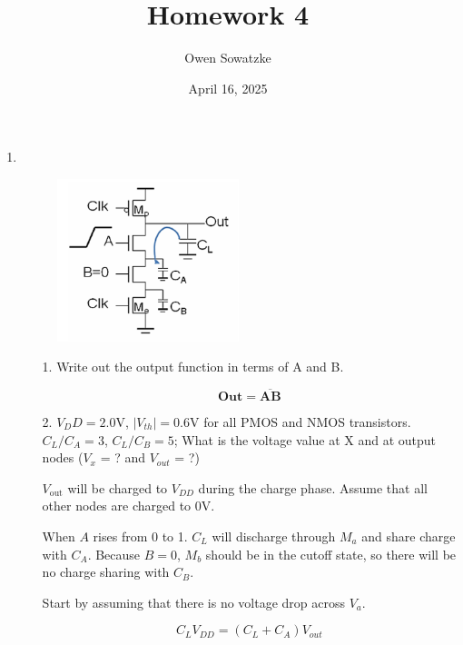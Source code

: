 \documentclass[fleqn]{article}
\title{Homework 4}
\author{Owen Sowatzke}
\date{April 16, 2025}
\newcommand{\zerodisplayskip}{
	\setlength{\abovedisplayskip}{0pt}%
	\setlength{\belowdisplayskip}{0pt}%
	\setlength{\abovedisplayshortskip}{0pt}%
	\setlength{\belowdisplayshortskip}{0pt}%
	\setlength{\mathindent}{0pt}}
\begin{document}
	\offinterlineskip
	\setlength{\lineskip}{12pt}
	\zerodisplayskip
	\maketitle
	
	\begin{enumerate}
		\item ~
		
			\begin{figure}[H]
				\centerline{\includegraphics[width=0.5\textwidth]{circuit_question1.png}}
				\label{fig::circuit_question1}
			\end{figure}

			\begin{enumerate}
			\item[1.] Write out the output function in terms of A and B.			
			
			\begin{equation*}
				\mathbf{Out = \overline{AB}}
			\end{equation*}
			
			\item[2.] $V_DD=2.0\text{V}$, $|V_{th}|=0.6\text{V}$ for all PMOS and NMOS transistors. $C_L/C_A=3$, $C_L/C_B=5$; What is the voltage value at X and at output nodes ($V_x$ = ? and $V_{out}$ = ?)
			
			$V_{\text{out}}$ will be charged to $V_{DD}$ during the charge phase. Assume that all other nodes are charged to $0\text{V}$.
			
			When $A$ rises from 0 to 1. $C_L$ will discharge through $M_a$ and share charge with $C_A$. Because $B=0$, $M_b$ should be in the cutoff state, so there will be no charge sharing with $C_B$.
			
			Start by assuming that there is no voltage drop across $V_a$.
			
			\begin{equation*}
				C_LV_{DD} = (C_L + C_A)V_{out} 
			\end{equation*}			
			

\end{enumerate}
\end{enumerate}
\end{document}
